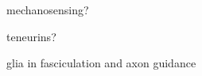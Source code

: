 mechanosensing? \cite{koser2016mechanosensing}

teneurins? \cite{leamey2014teneurins}

glia in fasciculation and axon guidance \cite{learte2007role}

